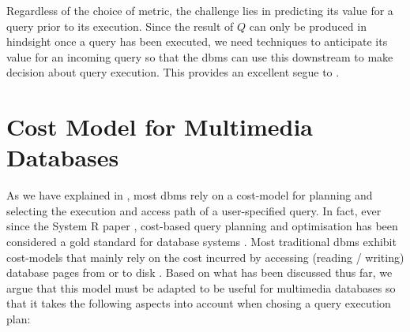 Regardless of the choice of metric, the challenge lies in predicting its value for a query prior to its execution. Since the result of $Q$ can only be produced in hindsight once a query has been executed, we need techniques to anticipate its value for an incoming query so that the \acrshort{dbms} can use this downstream to make decision about query execution. This provides an excellent segue to .

\section{Cost Model for Multimedia Databases}
\label{section:cost_model}

As we have explained in , most \acrshort{dbms} rely on a cost-model for planning and selecting the execution and access path of a user-specified query. In fact, ever since the System R paper \cite{Selinger:1979Access}, cost-based query planning and optimisation has been considered a gold standard for database systems \cite{Mannino:1988Statistical}. Most traditional \acrshort{dbms} exhibit cost-models that mainly rely on the cost incurred by accessing (reading / writing) database pages from or to disk \cite{Mannino:1988Statistical,Garcia:2009Database,Petrov:2019Database}. Based on what has been discussed thus far, we argue that this model must be adapted to be useful for multimedia databases so that it takes the following aspects into account when chosing a query execution plan:

